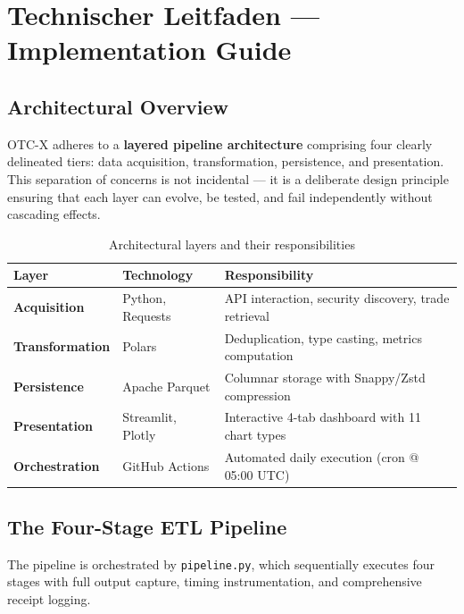 \documentclass[
  11pt,
  a4paper,
  twoside,
  openany
]{report}
\begin{document}
\chapter{Technischer Leitfaden — Implementation Guide}
\label{ch:implementation}

\section{Architectural Overview}

OTC-X adheres to a \textbf{layered pipeline architecture} comprising four clearly delineated tiers: data acquisition, transformation, persistence, and presentation.  This separation of concerns is not incidental — it is a deliberate design principle ensuring that each layer can evolve, be tested, and fail independently without cascading effects.

\begin{table}[H]
\centering
\caption{Architectural layers and their responsibilities}
\label{tab:architecture}
\begin{tabularx}{\textwidth}{>{\bfseries}l l X}
\toprule
\textbf{Layer} & \textbf{Technology} & \textbf{Responsibility} \\
\midrule
Acquisition  & Python, Requests  & API interaction, security discovery, trade retrieval \\
Transformation & Polars            & Deduplication, type casting, metrics computation \\
Persistence    & Apache Parquet    & Columnar storage with Snappy/Zstd compression \\
Presentation   & Streamlit, Plotly & Interactive 4-tab dashboard with 11 chart types \\
Orchestration  & GitHub Actions    & Automated daily execution (cron @ 05:00 UTC) \\
\bottomrule
\end{tabularx}
\end{table}

\section{The Four-Stage ETL Pipeline}

The pipeline is orchestrated by \texttt{pipeline.py}, which sequentially executes four stages with full output capture, timing instrumentation, and comprehensive receipt logging.
\end{document}
